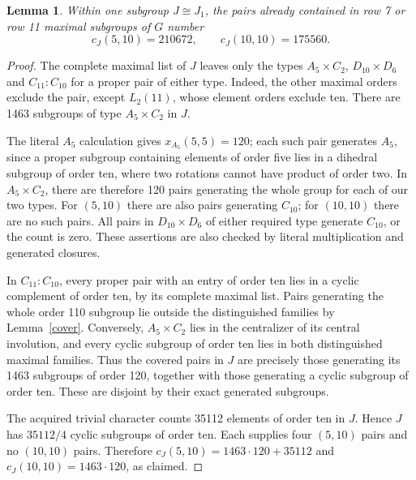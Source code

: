 \documentclass[11pt,a4paper]{article}
\newtheorem{lemma}{Lemma}\newtheorem{theorem}{Theorem}
\begin{document}
\begin{lemma}\label{J}
Within one subgroup $J\cong J_1$, the pairs already contained in
row 7 or row 11 maximal subgroups of $G$ number
\[
 c_J(5,10)=210672,\qquad c_J(10,10)=175560.
\]
\end{lemma}
\begin{proof}
The complete maximal list of $J$ leaves only the types
$A_5\times C_2$, $D_{10}\times D_6$ and $C_{11}:C_{10}$ for a
proper pair of either type. Indeed, the other maximal orders
exclude the pair, except $L_2(11)$, whose element orders exclude
ten. There are 1463 subgroups of type $A_5\times C_2$ in $J$.

The literal $A_5$ calculation gives $x_{A_5}(5,5)=120$; each
such pair generates $A_5$, since a proper subgroup containing
elements of order five lies in a dihedral subgroup of order ten,
where two rotations cannot have product of order two. In
$A_5\times C_2$, there are therefore 120 pairs generating the
whole group for each of our two types. For $(5,10)$ there are
also pairs generating $C_{10}$; for $(10,10)$ there are no such
pairs. All pairs in $D_{10}\times D_6$ of either required type
generate $C_{10}$, or the count is zero. These assertions are
also checked by literal multiplication and generated closures.

In $C_{11}:C_{10}$, every proper pair with an entry of order ten
lies in a cyclic complement of order ten, by its complete maximal
list. Pairs generating the whole order 110 subgroup lie outside
the distinguished families by Lemma~\ref{cover}. Conversely,
$A_5\times C_2$ lies in the centralizer of its central involution,
and every cyclic subgroup of order ten lies in both distinguished
maximal families. Thus the covered pairs in $J$ are precisely
those generating its 1463 subgroups of order 120, together with
those generating a cyclic subgroup of order ten. These are
disjoint by their exact generated subgroups.

The acquired trivial character counts 35112 elements of order
ten in $J$. Hence $J$ has $35112/4$ cyclic subgroups of order ten.
Each supplies four $(5,10)$ pairs and no $(10,10)$ pairs. Therefore
$c_J(5,10)=1463\cdot120+35112$ and
$c_J(10,10)=1463\cdot120$, as claimed.
\end{proof}
\end{document}

